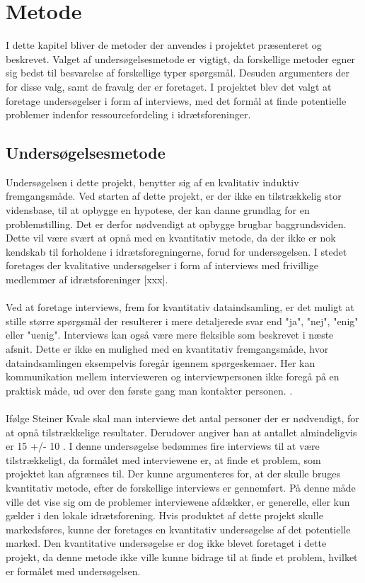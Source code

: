 \chapter{Metode}\label{ch:chlabel}
I dette kapitel bliver de metoder der anvendes i projektet præsenteret og beskrevet. Valget af undersøgelsesmetode er vigtigt, da forskellige metoder egner sig bedst til besvarelse af forskellige typer spørgsmål. Desuden argumenters der for disse valg, samt de fravalg der er foretaget. I projektet blev det valgt at foretage undersøgelser i form af interviews, med det formål at finde potentielle problemer indenfor ressourcefordeling i idrætsforeninger.
\\

\section{Undersøgelsesmetode}
Undersøgelsen i dette projekt, benytter sig af en kvalitativ induktiv fremgangsmåde. 
Ved starten af dette projekt, er der ikke en tilstrækkelig stor vidensbase, til at opbygge en hypotese, der kan danne grundlag for en problemstilling. Det er derfor nødvendigt at opbygge brugbar baggrundsviden. Dette vil være svært at opnå med en kvantitativ metode, da der ikke er nok kendskab til forholdene i idrætsforegningerne, forud for undersøgelsen. I stedet foretages der kvalitative undersøgelser i form af interviews med frivillige medlemmer af idrætsforeninger [xxx].
\\
\\
Ved at foretage interviews, frem for kvantitativ dataindsamling, er det muligt at stille større spørgsmål der resulterer i mere detaljerede svar end "ja", "nej", "enig" eller "uenig". Interviews kan også være mere fleksible som beskrevet i næste afsnit. Dette er ikke en mulighed med en kvantitativ fremgangsmåde, hvor dataindsamlingen eksempelvis foregår igennem spørgeskemaer. Her kan kommunikation mellem intervieweren og interviewpersonen ikke foregå på en praktisk måde, ud over den første gang man kontakter personen. \citep{kvale2015}.
\\
\\
Ifølge Steiner Kvale skal man interviewe det antal personer der er nødvendigt, for at opnå tilstrækkelige resultater. Derudover angiver han at antallet almindeligvis er 15 +/- 10 \cite{kvale2015}. I denne undersøgelse bedømmes fire interviews til at være tilstrækkeligt, da formålet med interviewene er, at finde et problem, som projektet kan afgrænses til. Der kunne argumenteres for, at der skulle bruges kvantitativ metode, efter de forskellige interviews er gennemført. På denne måde ville det vise sig om de problemer interviewene afdækker, er generelle, eller kun gælder i den lokale idrætsforening. Hvis produktet af dette projekt skulle markedsføres, kunne der foretages en kvantitativ undersøgelse af det potentielle marked. Den kvantitative undersøgelse er dog ikke blevet foretaget i dette projekt, da denne metode ikke ville kunne bidrage til at finde et problem, hvilket er formålet med undersøgelsen.

